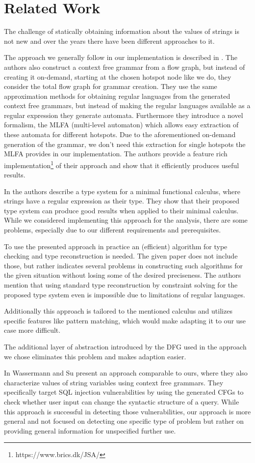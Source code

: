 \chapter{Related Work}
\label{chapter:RelatedWork}

The challenge of statically obtaining information about the values of strings is not new and over the years there have been different approaches to it.

The approach we generally follow in our implementation is described in \cite{brics} . The authors also construct a context free grammar from a flow graph, but instead of creating it on-demand, starting at the chosen hotspot node like we do, they consider the total flow graph for grammar creation. 
They use the same approximation methods for obtaining regular languages from the generated context free grammars, but instead of making the regular languages available as a regular expression they generate automata.
Furthermore they introduce a novel formalism, the MLFA (multi-level automaton) which allows easy extraction of these automata for different hotspots. Due to the aforementioned on-demand generation of the grammar, we don't need this extraction for single hotspots the MLFA provides in our implementation.
The authors provide a feature rich implementation\footnote{https://www.brics.dk/JSA/} of their approach and show that it efficiently produces useful results.


In \cite{regex_types} the authors describe a type system for a minimal functional calculus, where strings have a regular expression as their type. They show that their proposed type system can produce good results when applied to their minimal calculus. While we considered implementing this approach for the analysis, there are some problems, especially due to our different requirements and prerequisites.

To use the presented approach in practice an (efficient) algorithm for type checking and type reconstruction is needed. 
The given paper does not include those, but rather indicates several problems in constructing such algorithms for the given situation without losing some of the desired preciseness.
The authors mention that using standard type reconstruction by constraint solving for the proposed type system even is impossible due to limitations of regular languages.

Additionally this approach is tailored to the mentioned calculus and utilizes specific features like pattern matching, which would make adapting it to our use case more difficult.

The additional layer of abstraction introduced by the DFG used in the approach we chose eliminates this problem and makes adaption easier.


In \cite{sqli_wassermann_su} Wassermann and Su present an approach comparable to ours, where they also characterize values of string variables using context free grammars. They specifically target SQL injection vulnerabilities by using the generated CFGs to check whether user input can change the syntactic structure of a query. While this approach is successful in detecting those vulnerabilities, our approach is more general and not focused on detecting one specific type of problem but rather on providing general information for unspecified further use.